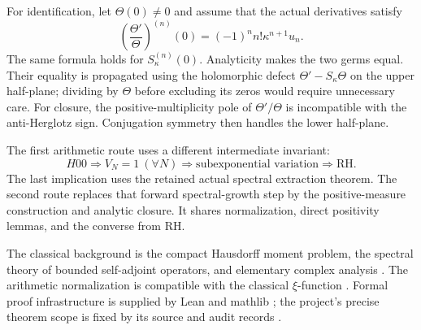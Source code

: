 For identification, let $\Theta(0)\ne0$ and assume that the actual
derivatives satisfy
\[
 \left(\frac{\Theta'}{\Theta}\right)^{(n)}(0)
   =(-1)^n n!\kappa^{n+1}u_n.
\]
The same formula holds for $S_\kappa^{(n)}(0)$. Analyticity makes
the two germs equal. Their equality is propagated using the holomorphic
defect $\Theta'-S_\kappa\Theta$ on the upper half-plane; dividing by
$\Theta$ before excluding its zeros would require unnecessary care.
For closure, the positive-multiplicity pole of $\Theta'/\Theta$ is
incompatible with the anti-Herglotz sign. Conjugation symmetry then
handles the lower half-plane.

The first arithmetic route uses a different intermediate invariant:
\[
 H00\Longrightarrow V_N=1\ (\forall N)
 \Longrightarrow \text{subexponential variation}
 \Longrightarrow\mathrm{RH}.
\]
The last implication uses the retained actual spectral extraction
theorem. The second route replaces that forward spectral-growth step
by the positive-measure construction and analytic closure. It shares
normalization, direct positivity lemmas, and the converse from RH.

The classical background is the compact Hausdorff moment problem,
the spectral theory of bounded self-adjoint operators, and elementary
complex analysis \cite{hausdorff,conway,rudin}. The arithmetic
normalization is compatible with the classical $\xi$-function
\cite{titchmarsh}. Formal proof infrastructure is supplied by Lean
and mathlib \cite{lean4,mathlib}; the project's precise theorem scope
is fixed by its source and audit records \cite{source}.

